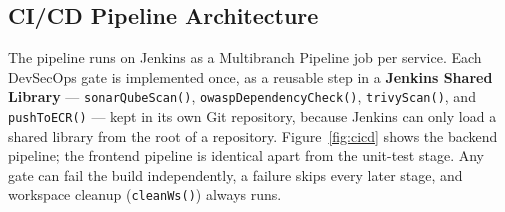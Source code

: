 \documentclass[11pt,a4paper]{article}
\begin{document}
\subsection{CI/CD Pipeline Architecture}
The pipeline runs on Jenkins as a Multibranch Pipeline job per service. Each
DevSecOps gate is implemented once, as a reusable step in a
\textbf{Jenkins Shared Library} --- \texttt{sonarQubeScan()},
\texttt{owaspDependencyCheck()}, \texttt{trivyScan()}, and
\texttt{pushToECR()} --- kept in its own Git repository, because Jenkins
can only load a shared library from the root of a repository.
Figure~\ref{fig:cicd} shows the backend pipeline; the frontend pipeline is
identical apart from the unit-test stage. Any gate can fail the build
independently, a failure skips every later stage, and workspace cleanup
(\texttt{cleanWs()}) always runs.
\end{document}
